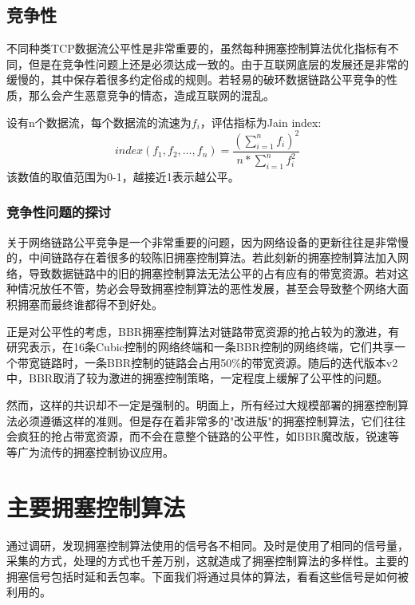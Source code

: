 \documentclass[a4paper, 12pt, UTF8]{ctexart}
\begin{document}
\subsection{竞争性}

\par 不同种类TCP数据流\cite{DBLP:conf/imc/WareMSS19}公平性是非常重要的，虽然每种拥塞控制算法优化指标有不同，但是在竞争性问题上还是必须达成一致的。由于互联网底层的发展还是非常的缓慢的，其中保存着很多约定俗成的规则。若轻易的破环数据链路公平竞争的性质，那么会产生恶意竞争的情态，造成互联网的混乱。
\par 设有n个数据流，每个数据流的流速为$f_i$，评估指标为Jain index:
$$
index(f_1, f_2,…,f_n)=\frac{(\sum_{i=1}^{n}f_i)^2}{n*\sum_{i=1}^nf_i^2}
$$
该数值的取值范围为0-1，越接近1表示越公平。

\subsubsection{竞争性问题的探讨}
\par 关于网络链路公平竞争是一个非常重要的问题，因为网络设备的更新往往是非常慢的，中间链路存在着很多的较陈旧拥塞控制算法。若此刻新的拥塞控制算法加入网络，导致数据链路中的旧的拥塞控制算法无法公平的占有应有的带宽资源。若对这种情况放任不管，势必会导致拥塞控制算法的恶性发展，甚至会导致整个网络大面积拥塞而最终谁都得不到好处。

\par 正是对公平性的考虑，BBR拥塞控制算法对链路带宽资源的抢占较为的激进，有研究表示\cite{DBLP:conf/sigcomm/SivaramanWTB14}，在16条Cubic控制的网络终端和一条BBR控制的网络终端，它们共享一个带宽链路时，一条BBR控制的链路会占用50\%的带宽资源。随后的迭代版本v2\cite{bbrv2}中，BBR取消了较为激进的拥塞控制策略，一定程度上缓解了公平性的问题。

\par 然而，这样的共识却不一定是强制的。明面上，所有经过大规模部署的拥塞控制算法必须遵循这样的准则。但是存在着非常多的"改进版"的拥塞控制算法，它们往往会疯狂的抢占带宽资源，而不会在意整个链路的公平性，如BBR魔改版，锐速等等\cite{linux-netspeed}广为流传的拥塞控制协议应用。

\clearpage

\section{主要拥塞控制算法}
通过调研，发现拥塞控制算法使用的信号各不相同。及时是使用了相同的信号量，采集的方式，处理的方式也千差万别，这就造成了拥塞控制算法的多样性。主要的拥塞信号包括时延和丢包率\cite{congestionControlCategory}。下面我们将通过具体的算法，看看这些信号是如何被利用的。
\end{document}
